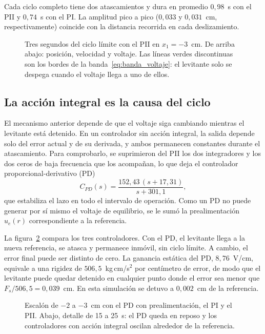 Cada ciclo completo tiene dos atascamientos y dura en promedio $0{,}98$~s con el PII y $0{,}74$~s con el PI. La amplitud pico a pico ($0{,}033$ y $0{,}031$~cm, respectivamente) coincide con la distancia recorrida en cada deslizamiento.

\begin{figure}[ht]
    \centering
    
    \caption[Anatomía del ciclo límite]{Tres segundos del ciclo límite con el PII en $x_1=-3$~cm. De arriba abajo: posición, velocidad y voltaje. Las líneas verdes discontinuas son los bordes de la banda~\eqref{eq:banda_voltaje}: el levitante solo se despega cuando el voltaje llega a uno de ellos.}
    \label{fig:anatomia}
\end{figure}

\subsection{La acción integral es la causa del ciclo}

El mecanismo anterior depende de que el voltaje siga cambiando mientras el levitante está detenido. En un controlador sin acción integral, la salida depende solo del error actual y de su derivada, y ambos permanecen constantes durante el atascamiento. Para comprobarlo, se suprimieron del PII los dos integradores y los dos ceros de baja frecuencia que los acompañan, lo que deja el controlador proporcional-derivativo (PD)
\begin{equation}
C_{PD}(s) = \frac{152{,}43\,(s+17{,}31)}{s+301{,}1} ,
\label{eq:pd}
\end{equation}
que estabiliza el lazo en todo el intervalo de operación. Como un PD no puede generar por sí mismo el voltaje de equilibrio, se le sumó la prealimentación $u_e(r)$ correspondiente a la referencia.

La figura~\ref{fig:pd_pi_pii} compara los tres controladores. Con el PD, el levitante llega a la nueva referencia, se atasca y permanece inmóvil, sin ciclo límite. A cambio, el error final puede ser distinto de cero. La ganancia estática del PD, $8{,}76$~V/cm, equivale a una rigidez de $506{,}5$~kg\,cm/s$^2$ por centímetro de error, de modo que el levitante puede quedar detenido en cualquier punto donde el error sea menor que $F_s/506{,}5 = 0{,}039$~cm. En esta simulación se detuvo a $0{,}002$~cm de la referencia.

\begin{figure}[ht]
    \centering
    
    \caption[PD, PI y PII con atascamiento-deslizamiento]{Escalón de $-2$ a $-3$~cm con el PD con prealimentación, el PI y el PII. Abajo, detalle de 15 a 25~s: el PD queda en reposo y los controladores con acción integral oscilan alrededor de la referencia.}
    \label{fig:pd_pi_pii}
\end{figure}

